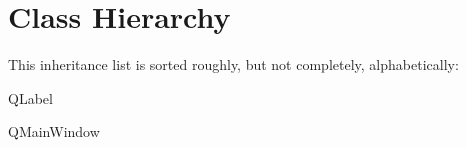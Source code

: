 \section{Class Hierarchy}
This inheritance list is sorted roughly, but not completely, alphabetically\+:\begin{DoxyCompactList}
\item {}
\item {}
\item {}
\item Q\+Label\begin{DoxyCompactList}
\item {}
\end{DoxyCompactList}
\item Q\+Main\+Window\begin{DoxyCompactList}
\item {}
\end{DoxyCompactList}
\item {}
\end{DoxyCompactList}
